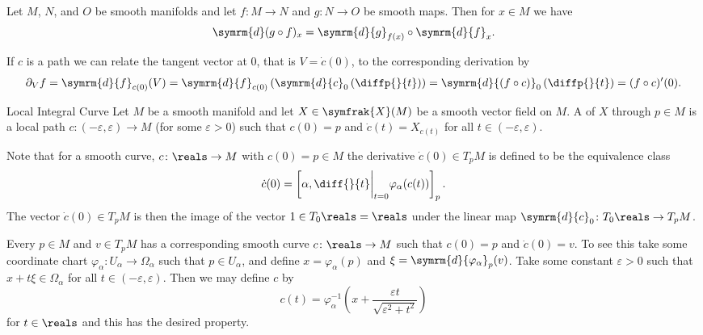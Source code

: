 \documentclass[fleqn]{NotesClass}
\renewcommand{\dl}{\symrm{d}}
\newcommand{\vectorFields}{\symfrak{X}}
\begin{document}
    \begin{prp}{}{}
        Let \(M\), \(N\), and \(O\) be smooth manifolds and let \(f \colon M \to N\) and \(g \colon N \to O\) be smooth maps.
        Then for \(x \in M\) we have
        \begin{equation}
            \dl (g \circ f)_x = \dl{g}_{f(x)} \circ \dl{f}_x.
        \end{equation}
    \end{prp}
    
    If \(c\) is a path we can relate the tangent vector at 0, that is \(V = \dot{c}(0)\), to the corresponding derivation by
    \begin{equation}
        \partial_V f = \dl{f}_{c(0)}(V) = \dl{f}_{c(0)}\left( \dl{c}_0\left( \diffp{}{t} \right) \right) = \dl{(f \circ c)}_0 \left( \diffp{}{t} \right) = (f \circ c)'(0).
    \end{equation}
    
    \begin{dfn}{Local Integral Curve}{}
        Let \(M\) be a smooth manifold and let \(X \in \vectorFields(M)\) be a smooth vector field on \(M\).
        A  of \(X\) through \(p \in M\) is a local path \(c \colon (-\varepsilon, \varepsilon) \to M\) (for some \(\varepsilon > 0\)) such that \(c(0) = p\) and \(\dot{c}(t) = X_{c(t)}\) for all \(t \in (-\varepsilon, \varepsilon)\).
    \end{dfn}
    
    Note that for a smooth curve, \(c \colon \reals \to M\) with \(c(0) = p \in M\) the derivative \(\dot{c}(0) \in T_pM\) is defined to be the equivalence class
    \begin{equation}
        \dot{c}(0) = \left[ \alpha, \diff{}{t}\bigg|_{t=0}\varphi_\alpha(c(t)) \right]_p.
    \end{equation}
    The vector \(\dot{c}(0) \in T_pM\) is then the image of the vector \(1 \in T_0\reals = \reals\) under the linear map \(\dl{c}_0 \colon T_0 \reals \to T_{p}M\).
    
    Every \(p \in M\) and \(v \in T_pM\) has a corresponding smooth curve \(c \colon \reals \to M\) such that \(c(0) = p\) and \(\dot{c}(0) = v\).
    To see this take some coordinate chart \(\varphi_\alpha \colon U_\alpha \to \Omega_\alpha\) such that \(p \in U_\alpha\), and define \(x = \varphi_\alpha(p)\) and \(\xi = \dl{\varphi_\alpha}_p(v)\).
    Take some constant \(\varepsilon > 0\) such that \(x + t\xi \in \Omega_\alpha\) for all \(t \in (-\varepsilon, \varepsilon)\).
    Then we may define \(c\) by
    \begin{equation}
        c(t) = \varphi_\alpha^{-1}\left( x + \frac{\varepsilon t}{\sqrt{\varepsilon^2 + t^2}} \right)
    \end{equation}
    for \(t \in \reals\) and this has the desired property.
    
\end{document}
